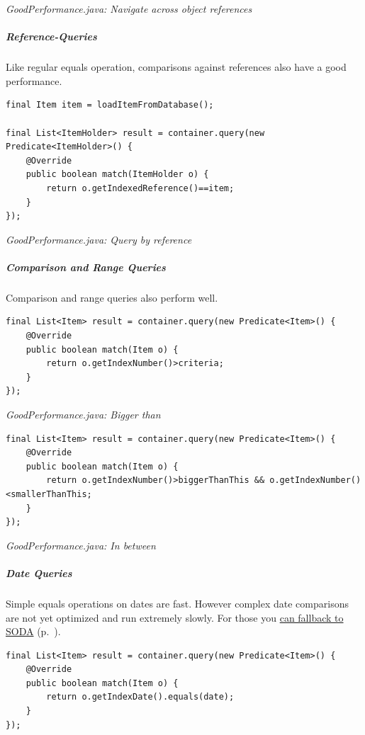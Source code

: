 {\small\itshape GoodPerformance.java: Navigate across object references\par}
\medskip

\subparagraph*{Reference-Queries}

Like regular equals operation, comparisons against references also have a good performance.

\begin{lstlisting}
final Item item = loadItemFromDatabase();

final List<ItemHolder> result = container.query(new Predicate<ItemHolder>() {
    @Override
    public boolean match(ItemHolder o) {
        return o.getIndexedReference()==item;
    }
});
\end{lstlisting}

{\small\itshape GoodPerformance.java: Query by reference\par}
\medskip

\subparagraph*{Comparison and Range Queries}

Comparison and range queries also perform well.

\begin{lstlisting}
final List<Item> result = container.query(new Predicate<Item>() {
    @Override
    public boolean match(Item o) {
        return o.getIndexNumber()>criteria;
    }
});
\end{lstlisting}

{\small\itshape GoodPerformance.java: Bigger than\par}
\medskip

\begin{lstlisting}
final List<Item> result = container.query(new Predicate<Item>() {
    @Override
    public boolean match(Item o) {
        return o.getIndexNumber()>biggerThanThis && o.getIndexNumber() <smallerThanThis;
    }
});
\end{lstlisting}

{\small\itshape GoodPerformance.java: In between\par}
\medskip

\subparagraph*{Date Queries}

Simple equals operations on dates are fast. However complex date comparisons are not yet optimized and run extremely slowly. For those you \hyperref[ref:basics-querying-soda-soda-performance-characteristics]{can fallback to SODA} (p.~\pageref{ref:basics-querying-soda-soda-performance-characteristics}).

\begin{lstlisting}
final List<Item> result = container.query(new Predicate<Item>() {
    @Override
    public boolean match(Item o) {
        return o.getIndexDate().equals(date);
    }
});
\end{lstlisting}

